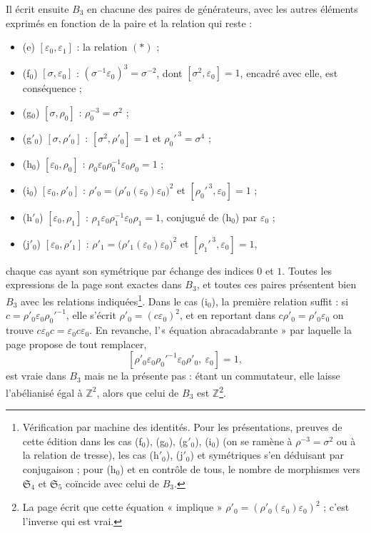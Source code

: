 \documentclass[11pt,a4paper]{article}
\begin{document}
Il écrit ensuite $B_3$ en chacune des paires de générateurs, avec les autres
éléments exprimés en fonction de la paire et la relation qui reste :
\begin{itemize}
\item (e) $[\varepsilon_0, \varepsilon_1]$ : la relation $(*)$ ;
\item (f$_0$) $[\sigma, \varepsilon_0]$ : $(\sigma^{-1}\varepsilon_0)^3 = \sigma^{-2}$,
dont $[\sigma^2, \varepsilon_0] = 1$, encadré avec elle, est conséquence ;
\item (g$_0$) $[\sigma, \rho_0]$ : $\rho_0^{-3} = \sigma^2$ ;
\item (g$'_0$) $[\sigma, \rho'_0]$ : $[\sigma^2, \rho'_0] = 1$ et $\rho_0'^{\,3} = \sigma^4$ ;
\item (h$_0$) $[\varepsilon_0, \rho_0]$ : $\rho_0\varepsilon_0\rho_0^{-1}\varepsilon_0\rho_0 = 1$ ;
\item (i$_0$) $[\varepsilon_0, \rho'_0]$ : $\rho'_0 = \bigl(\rho'_0(\varepsilon_0)\varepsilon_0\bigr)^2$ et $[\rho_0'^{\,3}, \varepsilon_0] = 1$ ;
\item (h$'_0$) $[\varepsilon_0, \rho_1]$ : $\rho_1\varepsilon_0\rho_1^{-1}\varepsilon_0\rho_1 = 1$, conjugué de (h$_0$) par $\varepsilon_0$ ;
\item (j$'_0$) $[\varepsilon_0, \rho'_1]$ : $\rho'_1 = \bigl(\rho'_1(\varepsilon_0)\varepsilon_0\bigr)^2$ et $[\rho_1'^{\,3}, \varepsilon_0] = 1$,
\end{itemize}
chaque cas ayant son symétrique par échange des indices $0$ et $1$. Toutes les
expressions de la page sont exactes dans $B_3$, et toutes ces paires
présentent bien $B_3$ avec les relations indiquées\footnote{Vérification par
machine des identités. Pour les présentations, preuves de cette édition dans
les cas (f$_0$), (g$_0$), (g$'_0$), (i$_0$) (on se ramène à
$\rho^{-3} = \sigma^2$ ou à la relation de tresse), les cas (h$'_0$),
(j$'_0$) et symétriques s'en déduisant par conjugaison ; pour (h$_0$) et en
contrôle de tous, le nombre de morphismes vers $\mathfrak{S}_4$ et
$\mathfrak{S}_5$ coïncide avec celui de $B_3$.}. Dans le cas
(i$_0$), la première relation suffit : si $c = \rho'_0\varepsilon_0\rho_0'^{-1}$,
elle s'écrit $\rho'_0 = (c\varepsilon_0)^2$, et en reportant dans
$c\rho'_0 = \rho'_0\varepsilon_0$ on trouve
$c\varepsilon_0 c = \varepsilon_0 c\varepsilon_0$. En revanche, l'« équation
abracadabrante » par laquelle la page propose de tout remplacer,
\[
[\rho'_0\varepsilon_0\rho_0'^{-1}\varepsilon_0\rho'_0,\ \varepsilon_0] = 1,
\]
est vraie dans $B_3$ mais ne la présente pas : étant un commutateur, elle laisse
l'abélianisé égal à $\mathbb{Z}^2$, alors que celui de $B_3$ est
$\mathbb{Z}$\footnote{La page écrit que cette équation « implique »
$\rho'_0 = (\rho'_0(\varepsilon_0)\varepsilon_0)^2$ ; c'est l'inverse qui est
vrai.}.
\end{document}
